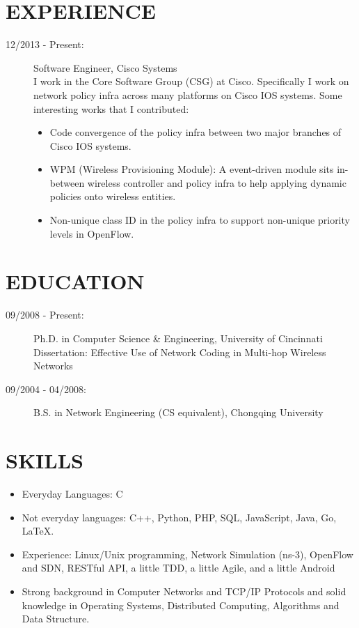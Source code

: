 \documentclass[line]{res}
\begin{document}
\address{350 Elan Village Ln \#111 \\ San Jose, CA 95134 \\ 513-679-0772}
\address{Email: \href{mailto:yang@yangchi.me}{yang@yangchi.me} \\ Github: \url{https://github.com/yangchi} }

\begin{resume}
	\section{EXPERIENCE}
	\begin{description}
		\item[12/2013 - Present:] Software Engineer, Cisco Systems \\
		I work in the Core Software Group (CSG) at Cisco. Specifically I work on network policy infra across many platforms on Cisco IOS systems. Some interesting works that I contributed:
        \begin{itemize}
            \item Code convergence of the policy infra between two major branches of Cisco IOS systems.
            \item WPM (Wireless Provisioning Module): A event-driven module sits in-between wireless controller and policy infra to help applying dynamic policies onto wireless entities.
			\item Non-unique class ID in the policy infra to support non-unique priority levels in OpenFlow.
		\end{itemize}
	\end{description}
	\section{EDUCATION}
	\begin{description}
		\item[09/2008 - Present:] Ph.D. in Computer Science \& Engineering, University of Cincinnati\\
			Dissertation: Effective Use of Network Coding in Multi-hop Wireless Networks
		\item[09/2004 - 04/2008:] B.S. in Network Engineering (CS equivalent), Chongqing University
	\end{description}
	
	\section{SKILLS}
	\begin{itemize}
		\item Everyday Languages: C
		\item Not everyday languages: C++, Python, PHP, SQL, JavaScript, Java, Go, LaTeX.
		\item Experience: Linux/Unix programming, Network Simulation (ns-3), OpenFlow and SDN, RESTful API, a little TDD, a little Agile, and a little Android
		\item Strong background in Computer Networks and TCP/IP Protocols and solid knowledge in Operating Systems, Distributed Computing, Algorithms and Data Structure.
	\end{itemize}


\end{resume}
\end{document}
